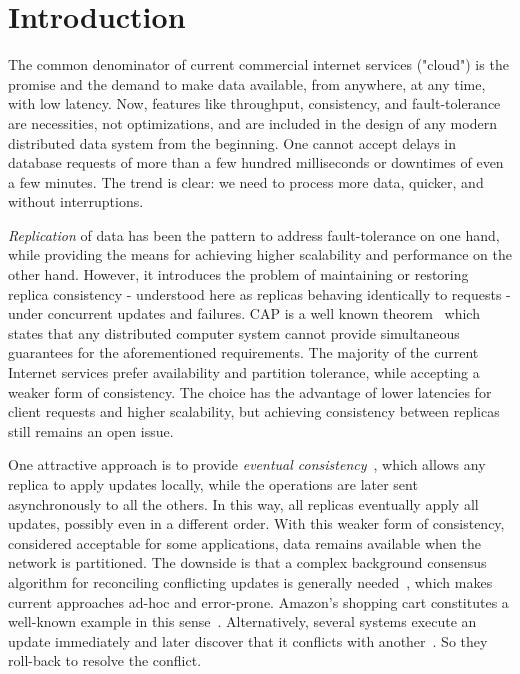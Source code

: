 \section{Introduction}
\label{sec:introduction}

The common denominator of current commercial internet services ("cloud") is the promise and the demand to make data available, from anywhere, at any time, with low latency.
Now, features like throughput, consistency, and fault-tolerance are necessities,
not optimizations, and are included in the design of any modern distributed data
system from the beginning. One cannot accept delays in database requests of more
than a few hundred milliseconds or downtimes of even a few minutes. The trend is
clear: we need to process more data, quicker, and without interruptions.

\textit{Replication} of data has been the pattern to address fault-tolerance on one hand,
while providing the means for achieving higher scalability and performance on the
other hand. However, it introduces the problem of maintaining or restoring replica consistency - understood here as replicas behaving identically to requests - under concurrent updates and failures. CAP is a well known
theorem~\cite{Gilbert:2002:BCF:564585.564601} which states that any distributed
computer system cannot provide simultaneous guarantees for the aforementioned
requirements. The majority of the current Internet services prefer availability
and partition tolerance, while accepting a weaker form of consistency. The choice
has the advantage of lower latencies for client requests and higher scalability,
but achieving consistency between replicas still remains an open issue.

One attractive approach is to provide \textit{eventual
consistency}~\cite{DBLP:journals/queue/Vogels08a,Saito:2005:OR:1057977.1057980},
which allows any replica to apply updates locally, while the operations are
later sent asynchronously to all the others. In this way, all replicas
eventually apply all updates, possibly even in a different order. With this
weaker form of consistency, considered acceptable for some applications, data
remains available when the network is partitioned. The downside is that a
complex background consensus algorithm for reconciling conflicting updates is
generally needed~\cite{Terry:1995:MUC:224056.224070}, which makes current
approaches ad-hoc and error-prone. Amazon's shopping cart constitutes a
well-known example in this sense~\cite{DeCandia:2007:DAH:1294261.1294281}.
Alternatively, several systems execute an update immediately and later discover
that it conflicts with another~\cite{Terry:1995:MUC:224056.224070}. So they
roll-back to resolve the conflict.

